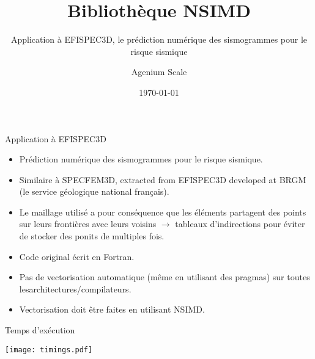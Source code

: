 \documentclass[shrink, compress, mathserif, 10pt, xcolor=dvipsnames,
               aspectratio=169]{beamer}
\title{Bibliothèque NSIMD}
\subtitle{Application à EFISPEC3D, le prédiction numérique des sismogrammes
          pour le risque sismique}
\date{\today}
\author{Agenium Scale}
\begin{document}
\begin{frame}[plain]
  \maketitle
\end{frame}



\begin{frame}{Application à EFISPEC3D}
  \begin{itemize}
    \item Prédiction numérique des sismogrammes pour le risque sismique.
    \vspace{1em}
    \item Similaire à SPECFEM3D, extracted from EFISPEC3D developed at BRGM
          (le service géologique national français).
    \vspace{1em}
    \item Le maillage utilisé a pour conséquence que les éléments partagent
          des points sur leurs frontières avec leurs voisins
          $\longrightarrow$ tableaux d'indirections pour éviter de stocker
          des ponits de multiples fois.
    \vspace{1em}
    \item Code original écrit en Fortran.
    \vspace{1em}
    \item Pas de vectorisation automatique (même en utilisant des pragmas) sur
          toutes lesarchitectures/compilateurs.
    \vspace{1em}
    \item Vectorisation doit être faites en utilisant NSIMD.
  \end{itemize}
\end{frame}

\begin{frame}{Temps d'exécution}
  \begin{center}
    \texttt{[image: timings.pdf]}
  \end{center}
\end{frame}
\end{document}
